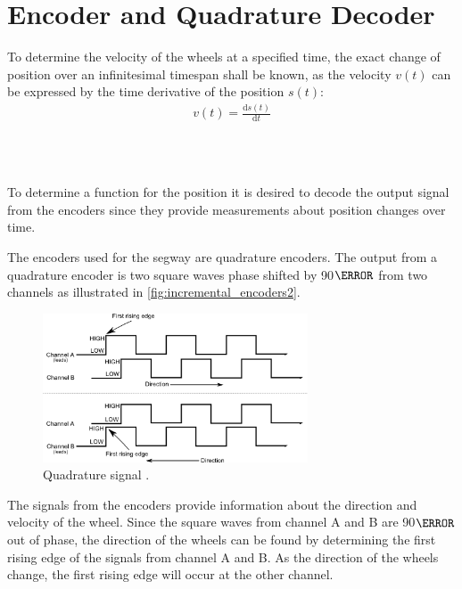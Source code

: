 \section{Encoder and Quadrature Decoder}

To determine the velocity of the wheels at a specified time, the exact change of position over an infinitesimal timespan shall be known, as the velocity $v(t)$ can be expressed by the time derivative of the position $s(t)$:
\begin{align}
v(t) = \frac{\text{d}s(t)}{\text{d}t}
\label{velocity}
\end{align}
\begin{where}
\\
\\
\end{where}

To determine a function for the position it is desired to decode the output signal from the encoders since they provide measurements about position changes over time. 

The encoders used for the segway are quadrature encoders. The output from a quadrature encoder is two square waves phase shifted by 90$\degree$ from two channels as illustrated in \autoref{fig:incremental_encoders2}. 

\begin{figure}[H]
	\centering
	\includegraphics[width=0.7\textwidth]{figures/quad-encoding-waveform.png}
	\caption{Quadrature signal \citep{sou:quad_enc}.}
	\label{fig:incremental_encoders2}
\end{figure}

The signals from the encoders provide information about the direction and velocity of the wheel. Since the square waves from channel A and B are 90$\degree$ out of phase, the direction of the wheels can be found by determining the first rising edge of the signals from channel A and B. As the direction of the wheels change, the first rising edge will occur at the other channel.

